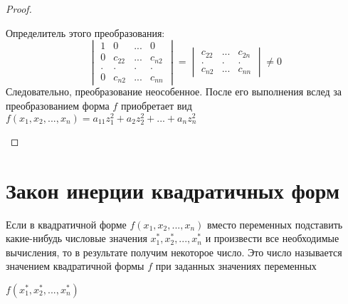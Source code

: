 \begin{proof}
\begin{itemize}
\begin{itemize}
			Определитель этого преобразования:
			$$
			\begin{vmatrix}
				1 & 0 & ... & 0 \\
				0 & c_{22} & ... & c_{n2} \\
				. & . & . & . \\
				0 & c_{n2} & ... & c_{nn}
			\end{vmatrix} =
			\begin{vmatrix}
				c_{22} & ... & c_{2n} \\
				. & . & . \\
				c_{n2} & ... & c_{nn}
			\end{vmatrix} \ne 0 $$
			Следовательно, преобразование  неособенное. После его выполнения вслед за преобразованием  форма $ f $ приобретает вид $ f(x_1, x_2, ..., x_n) = a_{11}z_1^2 + a_2z_2^2 + ... + a_nz_n^2 $
		\end{itemize}
	\end{itemize}
\end{proof}

\section{Закон инерции квадратичных форм}

\begin{definition}
	Если в квадратичной форме $ f(x_1, x_2, ..., x_n) $ вместо переменных подставить какие-нибудь числовые значения $ x_1^*, x_2^*, ..., x_n^* $ и произвести все необходимые вычисления, то в результате получим некоторое число. Это число называется значением квадратичной формы $ f $ при заданных значениях переменных
\end{definition}

\begin{notation}
	$ f(x_1^*, x_2^*, ..., x_n^*) $
\end{notation}

